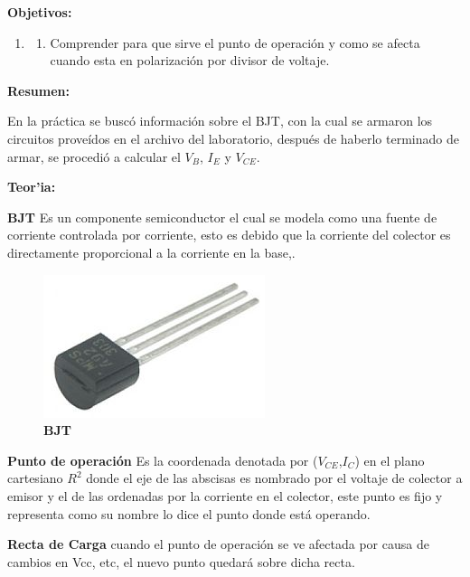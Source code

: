 \documentclass[11pt, letterpaper]{report}
\newcommand{\Center}[1]{
	\begin{center}
		#1
	\end{center}
} %
\newenvironment{enumTab}{\begin{enumerate}[label=]\item \begin{enumerate}[label=$\bullet$]}{\end{enumerate}\end{enumerate}} %
\newenvironment{block}[1]{\hspace{-0.8 cm}\textbf{\Large #1}}{\vspace{3 mm}} %
\begin{document}
 
	
	\begin{block}{Objetivos:}
		\begin{enumTab}
			\item Comprender para que sirve el punto de operaci\'on y como se afecta cuando esta en polarizaci\'on por divisor de voltaje.
		\end{enumTab}
	\end{block}
	
	\begin{block}{Resumen:}
		
		En la pr\'actica se busc\'o informaci\'on sobre el BJT, con la cual se armaron los circuitos prove\'idos en el archivo del laboratorio, despu\'es de haberlo terminado de armar, se procedi\'o a calcular el $V_B$, $I_E$ y $V_{CE}$.
	\end{block}
		
	\begin{block}{Teor'ia:}
	
		\textbf{BJT} Es un componente semiconductor el cual se modela como una fuente de corriente controlada por corriente, esto es debido que la corriente del colector es directamente proporcional a la corriente en la base,.
		
		
		\begin{figure}[H]
			\Center{
				\includegraphics[scale=.4]{BJT.jpg}
				\caption{\textbf{BJT}}
			}
		\end{figure}
	
		\textbf{Punto de operaci\'on} Es la coordenada denotada por ($V_{CE}$,$I_C$) en el plano cartesiano $R^2$ donde el eje de las abscisas es nombrado por el voltaje de colector a emisor y el de las ordenadas por la corriente en el colector, este punto es fijo y representa como su nombre lo dice el punto donde est\'a operando.
		
		\textbf{Recta de Carga} cuando el punto de operaci\'on se ve afectada por causa de cambios en Vcc, etc, el nuevo punto quedará sobre dicha recta.
		
	
	\end{block}
		
\end{document}
